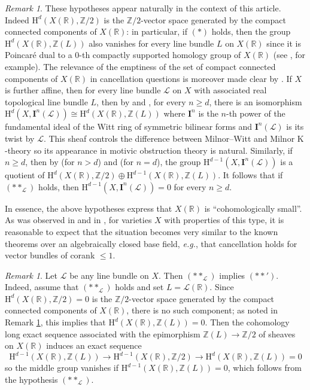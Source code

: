 \documentclass[11pt,leqno]{amsart}
\renewcommand{\1}{{\rm 1\hspace*{-0.4ex}%
\rule{0.1ex}{1.52ex}\hspace*{0.2ex}}}
\renewcommand{\Lc}{{\mathcal L}}
\newcommand{\Hr}{{\mathrm {H}}}
\newcommand{\<}[1]{{\langle}#1 {\rangle}}
\newcommand{\Ibf}{\mathbf{I}}
\newcommand{\Rb}{\mathbb{R}}
\newcommand{\Kr}{\mathrm{K}}
\newcommand{\Zb}{\mathbb{Z}}
\theoremstyle{plain}
\theoremstyle{definition}
\theoremstyle{remark}
\newtheorem{rem}[thm]{Remark}
\numberwithin{equation}{section}
\begin{document}
\begin{rem}\label{rem:relevance_cohomological_assumptions}
These hypotheses appear naturally in the context of this article. Indeed $\Hr^d(X(\Rb),\Zb/2)$ is the $\Zb/2$-vector space generated by the compact connected components of $X(\Rb)$: in particular, if $(*)$ holds, then the group $\Hr^d(X(\Rb),\Zb(L))$ also vanishes for every line bundle $L$ on $X(\Rb)$ since it is Poincaré dual to a $0$-th compactly supported homology group of $X(\Rb)$ (see \cite[Corollary 1.2.2]{faselVasersteinSymbolReal2018}, for example). The relevance of the emptiness of the set of compact connected components of $X(\Rb)$ in cancellation questions is moreover made clear by \cite[Theorems 4.11 and 4.15]{dasOrbitSpacesUnimodular2018}. If $X$ is further affine, then for every line bundle $\Lc$ on $X$ with associated real topological line bundle $L$, then by \cite[Corollary 8.11]{jacobsonRealCohomologyPowers2017} and \cite[Theorem 3.5]{lerbetImageHigherSignature2026}, for every $n\geq d$, there is an isomorphism $\Hr^d(X,\Ibf^n(\Lc))\cong\Hr^d(X(\Rb),\Zb(L))$ where $\Ibf^n$ is the $n$-th power of the fundamental ideal of the Witt ring of symmetric bilinear forms and $\Ibf^n(\Lc)$ is its twist by $\Lc$. This sheaf controls the difference between Milnor--Witt and Milnor $\Kr$-theory so its appearance in motivic obstruction theory is natural. Similarly, if $n\geq d$, then by \cite[Corollary 8.11]{jacobsonRealCohomologyPowers2017} (for $n>d$) and \cite{asokSplittingVectorBundles2025} (for $n=d$), the group $\Hr^{d-1}(X,\Ibf^n(\Lc))$ is a quotient of $\Hr^d(X(\Rb),\Zb/2)\oplus\Hr^{d-1}(X(\Rb),\Zb(L))$. It follows that if $(**_\Lc)$ holds, then $\Hr^{d-1}(X,\Ibf^n(\Lc))=0$ for every $n\geq d$.
\end{rem}

In essence, the above hypotheses express that $X(\Rb)$ is ``cohomologically small''. As was observed in \cite{asokSplittingVectorBundles2025} and in \cite{lerbetCohomologicalClassificationVector2026}, for varieties $X$ with properties of this type, it is reasonable to expect that the situation becomes very similar to the known theorems over an algebraically closed base field, \emph{e.g.}, that cancellation holds for vector bundles of corank $\leq 1$.

\begin{rem}\label{rem:double_star_weaker}
Let $\Lc$ be any line bundle on $X$. Then $(**_\Lc)$ implies $(**')$. Indeed, assume that $(**_\Lc)$ holds and set $L=\Lc(\Rb)$. Since $\Hr^d(X(\Rb),\Zb/2)=0$ is the $\Zb/2$-vector space generated by the compact connected components of $X(\Rb)$, there is no such component; as noted in Remark \ref{rem:relevance_cohomological_assumptions}, this implies that $\Hr^d(X(\Rb),\Zb(L))=0$. Then the cohomology long exact sequence associated with the epimorphism $\Zb(L)\to\Zb/2$ of sheaves on $X(\Rb)$ induces an exact sequence \[\Hr^{d-1}(X(\Rb),\Zb(L))\to\Hr^{d-1}(X(\Rb),\Zb/2)\to\Hr^{d}(X(\Rb),\Zb(L))=0\] so the middle group vanishes if $\Hr^{d-1}(X(\Rb),\Zb(L))=0$, which follows from the hypothesis $(**_\Lc)$.
\end{rem}
\end{document}
